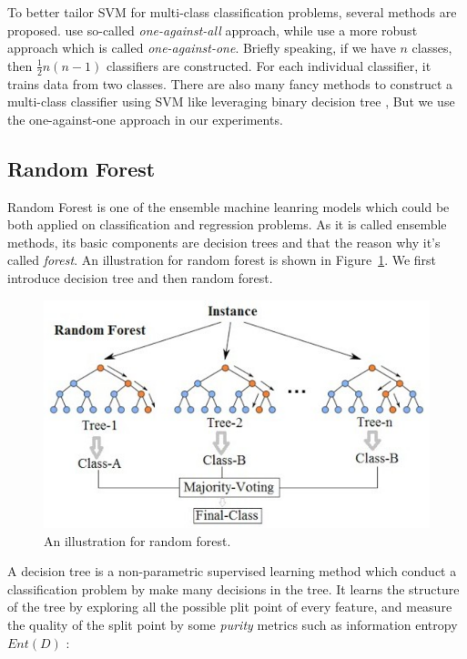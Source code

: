 \documentclass[sigconf]{acmart}
\begin{document}
	To better tailor SVM for multi-class classification problems, several methods are proposed. \citet{liu2005one} use so-called \textit{one-against-all} approach, while \citet{knerr1990single} use a more robust approach which is called \textit{one-against-one}. Briefly speaking, if we have $n$ classes, then $\frac{1}{2}n(n-1)$ classifiers are constructed. For each individual classifier, it trains data from two classes. There are also many fancy methods to construct a multi-class classifier using SVM like leveraging binary decision tree \cite{madzarov2009multi}, But we use the one-against-one approach in our experiments.


	\subsection{Random Forest}
	Random Forest \cite{breiman2001random} is one of the ensemble machine leanring models \cite{zhou2012ensemble} which could be both applied on classification and regression problems. As it is called ensemble methods, its basic components are decision trees \cite{safavian1991survey} and that the reason why it's called \textit{forest}. An illustration for random forest is shown in Figure~\ref{fig:rand-forest}. We first introduce decision tree and then random forest. 
	
	\begin{figure}[h]
	\centering
	\includegraphics[width=0.8\linewidth]{../figs/rand-forest}
	\caption{An illustration for random forest.}
	\label{fig:rand-forest}
	\end{figure}
	
	A decision tree is a non-parametric supervised learning method which conduct a classification problem by make many decisions in the tree. It learns the structure of the tree by exploring all the possible plit point of every feature, and measure the quality of the split point by some \textit{purity} metrics such as information entropy $Ent(D)$ :
	
\end{document}
